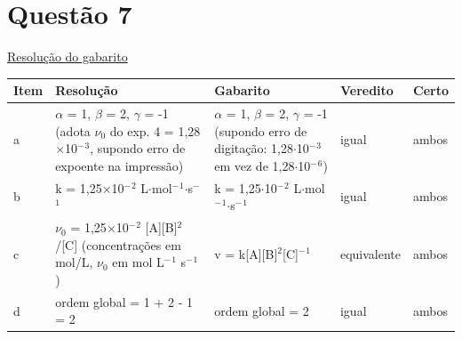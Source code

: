 \documentclass{article}%
\begin{document}
\section*{Questão 7}%
\href{https://poliedroresolve.sistemapoliedro.com.br/vestibulares/ime/2027/ime-2-fase-dia-3-28-10-2026-2-fase-dia-3/dissertativa-7-quimica-2-fase-dia-3-ime-2027}{Resolução do gabarito}\par\smallskip%
\begin{longtable}{@{}p{} p{} p{} p{} p{}@{}}\toprule Item & Resolução & Gabarito & Veredito & Certo \\ \midrule
a & $\alpha$ = 1, $\beta$ = 2, $\gamma$ = -1 (adota $\nu$$_{0}$ do exp. 4 = 1,28$\times$10$^{-}$$^3$, supondo erro de expoente na impressão) & $\alpha$ = 1, $\beta$ = 2, $\gamma$ = -1 (supondo erro de digitação: 1,28$\cdot$10$^{-}$$^3$ em vez de 1,28$\cdot$10$^{-}$$^{6}$) & igual & ambos \\
b & k = 1,25$\times$10$^{-}$$^2$ L$\cdot$mol$^{-}$$^{1}$$\cdot$s$^{-}$$^{1}$ & k = 1,25$\cdot$10$^{-}$$^2$ L$\cdot$mol$^{-}$$^{1}$$\cdot$s$^{-}$$^{1}$ & igual & ambos \\
c & $\nu$$_{0}$ = 1,25$\times$10$^{-}$$^2$ {[}A{]}{[}B{]}$^2$/{[}C{]} (concentrações em mol/L, $\nu$$_{0}$ em mol L$^{-}$$^{1}$ s$^{-}$$^{1}$) & v = k{[}A{]}{[}B{]}$^2${[}C{]}$^{-}$$^{1}$ & equivalente & ambos \\
d & ordem global = 1 + 2 - 1 = 2 & ordem global = 2 & igual & ambos \\
\bottomrule\end{longtable}%
\end{document}
